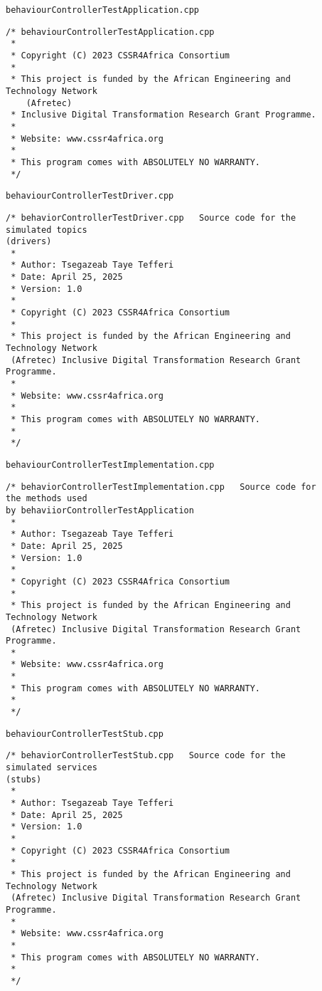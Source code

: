 \documentclass{CSSRforAfrica}
\newcommand{\checkboxChecked}{\fbox{\ding{51}}} %
\begin{document}
\begin{description}

\item[\checkboxChecked] {\small \verb+behaviourControllerTestApplication.cpp+}  
{\small \begin{verbatim}
/* behaviourControllerTestApplication.cpp
 * 
 * Copyright (C) 2023 CSSR4Africa Consortium
 * 
 * This project is funded by the African Engineering and Technology Network 
    (Afretec) 
 * Inclusive Digital Transformation Research Grant Programme. 
 *
 * Website: www.cssr4africa.org
 *
 * This program comes with ABSOLUTELY NO WARRANTY.
 */
\end{verbatim} }

\item[\checkboxChecked] {\small \verb+behaviourControllerTestDriver.cpp+}  
{\small \begin{verbatim}
/* behaviorControllerTestDriver.cpp   Source code for the simulated topics 
(drivers)
 *
 * Author: Tsegazeab Taye Tefferi
 * Date: April 25, 2025
 * Version: 1.0
 *
 * Copyright (C) 2023 CSSR4Africa Consortium
 *
 * This project is funded by the African Engineering and Technology Network 
 (Afretec) Inclusive Digital Transformation Research Grant Programme.
 *
 * Website: www.cssr4africa.org
 *
 * This program comes with ABSOLUTELY NO WARRANTY.
 *
 */
\end{verbatim} }

\item[\checkboxChecked]  {\small \verb+behaviourControllerTestImplementation.cpp+}  
{\small \begin{verbatim}
/* behaviorControllerTestImplementation.cpp   Source code for the methods used 
by behaviiorControllerTestApplication
 *
 * Author: Tsegazeab Taye Tefferi
 * Date: April 25, 2025
 * Version: 1.0
 *
 * Copyright (C) 2023 CSSR4Africa Consortium
 *
 * This project is funded by the African Engineering and Technology Network 
 (Afretec) Inclusive Digital Transformation Research Grant Programme.
 *
 * Website: www.cssr4africa.org
 *
 * This program comes with ABSOLUTELY NO WARRANTY.
 *
 */

\end{verbatim} }

\item[\checkboxChecked] {\small \verb+behaviourControllerTestStub.cpp+}  
{\small \begin{verbatim}
/* behaviorControllerTestStub.cpp   Source code for the simulated services 
(stubs)
 *
 * Author: Tsegazeab Taye Tefferi
 * Date: April 25, 2025
 * Version: 1.0
 *
 * Copyright (C) 2023 CSSR4Africa Consortium
 *
 * This project is funded by the African Engineering and Technology Network 
 (Afretec) Inclusive Digital Transformation Research Grant Programme.
 *
 * Website: www.cssr4africa.org
 *
 * This program comes with ABSOLUTELY NO WARRANTY.
 *
 */
\end{verbatim} }


\end{description}
\end{document}
